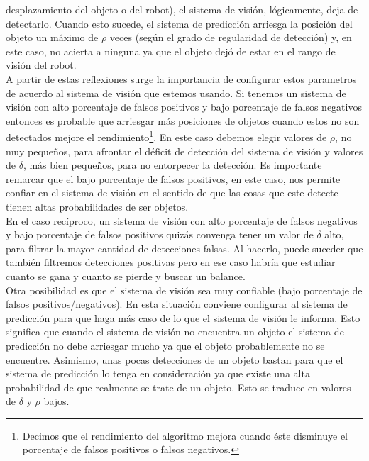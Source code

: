 desplazamiento del objeto o del robot), el sistema de visi\'on, 
l\'ogicamente, deja de detectarlo. Cuando esto sucede, el sistema de 
predicci\'on arriesga la posici\'on del objeto un m\'aximo de $\rho$ veces 
(seg\'un el grado de regularidad de detecci\'on) y, en este caso, no 
acierta a ninguna ya que el objeto dej\'o de estar en el rango de visi\'on del 
robot.\\ 
\indent A partir de estas reflexiones surge la importancia de configurar 
estos parametros de acuerdo al sistema de visi\'on que estemos 
usando. Si tenemos un sistema de visi\'on con alto porcentaje de 
falsos positivos y bajo porcentaje de falsos negativos entonces es 
probable que arriesgar m\'as posiciones de objetos cuando estos no 
son detectados mejore el rendimiento\footnote{ Decimos que el 
rendimiento del algoritmo mejora cuando \'este disminuye el 
porcentaje de falsos positivos o falsos negativos.}. En este caso debemos elegir 
valores de $\rho$, no muy peque\~nos, para afrontar el d\'eficit de 
detecci\'on del sistema de visi\'on y valores de $\delta$, m\'as bien 
peque\~nos, para no entorpecer la detecci\'on. Es importante remarcar 
que el bajo porcentaje de falsos positivos, en este caso, nos 
permite confiar en el sistema de visi\'on en el sentido de que las cosas que 
este detecte tienen altas probabilidades de ser objetos. \\
\indent En el caso rec\'iproco, un sistema de visi\'on con alto 
porcentaje de falsos negativos y bajo porcentaje de falsos 
positivos quiz\'as convenga tener un valor de $\delta$ alto, para 
filtrar la mayor cantidad de detecciones falsas. Al hacerlo, puede 
suceder que tambi\'en filtremos detecciones positivas pero en ese 
caso habr\'ia que estudiar cuanto se gana y cuanto se pierde y 
buscar un balance.\\
\indent Otra posibilidad es que el sistema de visi\'on sea muy 
confiable (bajo porcentaje de falsos positivos/negativos). En 
esta situaci\'on conviene configurar al sistema de predicci\'on para 
que haga m\'as caso de lo que el sistema de visi\'on le informa. Esto 
significa que cuando el sistema de visi\'on no encuentra un objeto 
el sistema de predicci\'on no debe arriesgar mucho ya que el objeto 
probablemente no se encuentre. Asimismo, unas pocas detecciones de 
un objeto bastan para que el sistema de predicci\'on lo tenga 
en consideraci\'on ya que existe una alta probabilidad de que 
realmente se trate de un objeto. Esto se traduce en valores de 
$\delta$ y $\rho$ bajos.
 


